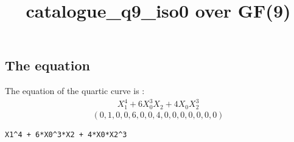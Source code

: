 \documentclass{article}
\newcommand\setTBstruts{\def\T{\rule{0pt}{2.6ex}}%
\def\B{\rule[-1.2ex]{0pt}{0pt}}}
\begin{document}
 
\setTBstruts



{\allowdisplaybreaks%






\title{catalogue\_q9\_iso0 over GF(9)}
\author{}%
\maketitle%
%



\subsection*{The equation}
The equation of the quartic curve  is :
$$
\begin{array}{c}
X_1^4 + 6X_0^3X_2 + 4X_0X_2^3\end{array}
$$
$$
( 0, 1, 0, 0, 6, 0, 0, 4, 0, 0, 0, 0, 0, 0, 0 )$$
\begin{verbatim}
X1^4 + 6*X0^3*X2 + 4*X0*X2^3
\end{verbatim}
}
\end{document}
